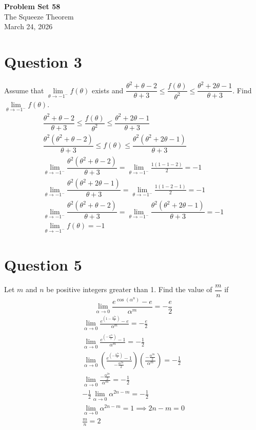 \documentclass[12pt]{article}
\begin{document}
\vspace*{0cm}

\begin{center}
    {\Large \bfseries Problem Set 58} \\[0.5cm]
    {\large The Squeeze Theorem} \\[0.35cm]
    {\normalsize March 24, 2026}
\end{center}


\section{Question 3}
Assume that $\lim\limits_{\theta \to -1^-}f(\theta)$ exists and $\dfrac{\theta^2+\theta-2}{\theta +3} \le \dfrac{f(\theta)}{\theta^2} \le \dfrac{\theta^2+2\theta-1}{\theta +3}$. Find $\lim\limits_{\theta \to -1^-}f(\theta)$.
\begin{gather*}
    \dfrac{\theta^2+\theta-2}{\theta +3} \le \dfrac{f(\theta)}{\theta^2} \le \dfrac{\theta^2+2\theta-1}{\theta +3}\\
    \dfrac{\theta^2(\theta^2+\theta-2)}{\theta +3} \le f(\theta) \le \dfrac{\theta^2(\theta^2+2\theta-1)}{\theta +3}\\
    \lim\limits_{\theta \to -1^-}\dfrac{\theta^2(\theta^2+\theta-2)}{\theta +3}=\lim\limits_{\theta \to -1^-}\frac{1(1-1-2)}{2}=-1\\
    \lim\limits_{\theta \to -1^-}\dfrac{\theta^2(\theta^2+2\theta-1)}{\theta +3}=\lim\limits_{\theta \to -1^-}\frac{1(1-2-1)}{2}=-1\\
    \lim\limits_{\theta \to -1^-}\dfrac{\theta^2(\theta^2+\theta-2)}{\theta +3}=\lim\limits_{\theta \to -1^-}\dfrac{\theta^2(\theta^2+2\theta-1)}{\theta +3}=-1\\
    \boxed{\lim\limits_{\theta \to -1^-}f(\theta)=-1}
\end{gather*}

\section{Question 5}
Let $m$ and $n$ be positive integers greater than 1. Find the value of $\dfrac{m}{n}$ if
\[
\lim\limits_{\alpha \to 0} \frac{e^{\cos (\alpha ^n)}-e}{\alpha ^ m}=-\frac{e}{2}
\]
\begin{gather*}
    \lim\limits_{\alpha \to 0} \frac{e^{(1-\frac{\alpha ^ {2n}}{2})}-e}{\alpha ^ m}=-\frac{e}{2}\\
    \lim\limits_{\alpha \to 0} \frac{e^{(-\frac{\alpha ^ {2n}}{2})}-1}{\alpha ^ m}=-\frac{1}{2}\\
    \lim\limits_{\alpha \to 0} (\frac{e^{(-\frac{\alpha ^ {2n}}{2})}-1}{-\frac{\alpha ^ {2n}}{2}})(\frac{-\frac{\alpha ^ {2n}}{2}}{\alpha ^m})=-\frac{1}{2}\\
    \lim\limits_{\alpha \to 0}\frac{-\frac{\alpha ^ {2n}}{2}}{\alpha ^m}=-\frac{1}{2}\\
    -\frac{1}{2} \lim\limits_{\alpha \to 0} \alpha ^{2n-m}=-\frac{1}{2} \\
    \lim\limits_{\alpha \to 0} \alpha ^{2n-m}=1\implies 2n-m=0\\
    \boxed{\frac{m}{n}=2}
\end{gather*}
\end{document}
